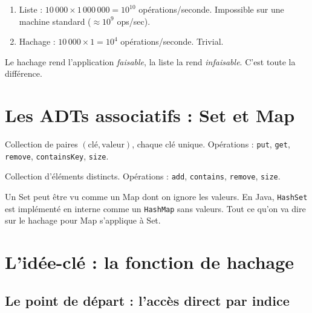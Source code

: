 \documentclass[11pt,a4paper]{article}
\begin{document}
\begin{appliboxR}[Réponse]
\begin{enumerate}[nosep]
    \item Liste : $10\,000 \times 1\,000\,000 = 10^{10}$ opérations/seconde. Impossible sur une machine standard ($\approx 10^9$ ops/sec).
    \item Hachage : $10\,000 \times 1 = 10^{4}$ opérations/seconde. Trivial.
\end{enumerate}
Le hachage rend l'application \emph{faisable}, la liste la rend \emph{infaisable}. C'est toute la différence.
\end{appliboxR}

\section{Les ADTs associatifs : Set et Map}

\begin{infobox}
Collection de paires $(\text{clé}, \text{valeur})$, chaque clé unique. Opérations : \texttt{put}, \texttt{get}, \texttt{remove}, \texttt{containsKey}, \texttt{size}.
\end{infobox}

\begin{infobox}
Collection d'éléments distincts. Opérations : \texttt{add}, \texttt{contains}, \texttt{remove}, \texttt{size}.
\end{infobox}

\begin{retenirbox}
Un Set peut être vu comme un Map dont on ignore les valeurs. En Java, \texttt{HashSet} est implémenté en interne comme un \texttt{HashMap} sans valeurs. Tout ce qu'on va dire sur le hachage pour Map s'applique à Set.
\end{retenirbox}

\section{L'idée-clé : la fonction de hachage}

\subsection{Le point de départ : l'accès direct par indice}
\end{document}
